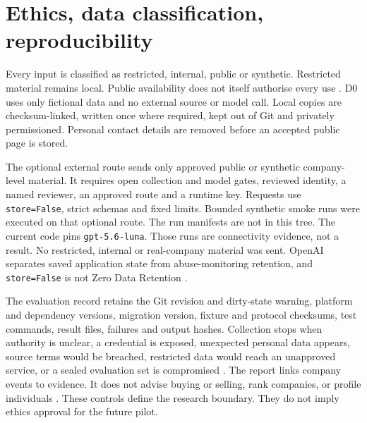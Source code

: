 \section{Ethics, data classification, reproducibility}
\label{sec:ethics}

Every input is classified as restricted, internal, public or synthetic. Restricted material remains
local. Public availability does not itself authorise every use
\citep{gebru2021datasheets,cddo2023genai,nist2023airmf}. D0 uses only fictional data and no external
source or model call. Local copies are checksum-linked, written once where required, kept out of Git
and privately permissioned. Personal contact details are removed before an accepted public page is
stored.

The optional external route sends only approved public or synthetic company-level material. It
requires open collection and model gates, reviewed identity, a named reviewer, an approved route and
a runtime key. Requests use \texttt{store=False}, strict schemas and fixed limits. Bounded
synthetic smoke runs were executed on that optional route. The run manifests are not in this
tree. The current code pins \texttt{gpt-5.6-luna}. Those runs are connectivity evidence, not a
result. No restricted, internal or real-company material was sent. OpenAI separates saved
application state from abuse-monitoring retention, and \texttt{store=False} is not Zero Data
Retention \citep{openai2026datacontrols,cddo2023genai}.

The evaluation record retains the Git revision and dirty-state warning, platform and dependency
versions, migration version, fixture and protocol checksums, test commands, result files, failures
and output hashes. Collection stops when authority is unclear, a credential is exposed, unexpected
personal data appears, source terms would be breached, restricted data would reach an unapproved
service, or a sealed evaluation set is compromised
\citep{pineau2021reproducibility,nist2023airmf}. The report links company events to evidence. It does
not advise buying or selling, rank companies, or profile individuals
\citep{fca2024promotions,cddo2023genai}. These controls define the research boundary. They do not
imply ethics approval for the future pilot.

